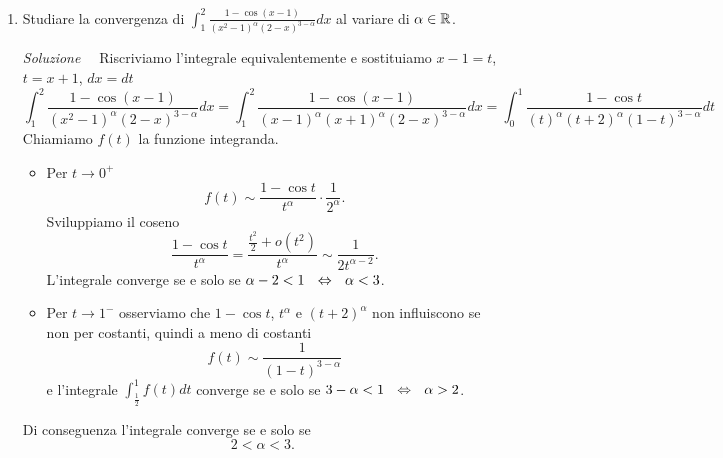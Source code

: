 \documentclass{article}
\begin{document}
\begin{enumerate}[label=\textbf{Esercizio 11.\arabic*.},itemindent=*]
\item Studiare la convergenza di $\int_1^2\frac{1-\cos (x-1)}{(x^2-1)^\alpha(2-x)^{3-\alpha}}dx$ al variare di $\alpha \in \mathbb{R}$.
\item[\textit{\large Soluzione~}]~Riscriviamo l'integrale equivalentemente e sostituiamo $x-1=t$, $t=x+1$, $dx=dt$
\[\int_1^2\frac{1-\cos (x-1)}{(x^2-1)^\alpha(2-x)^{3-\alpha}}dx=\int_1^2\frac{1-\cos (x-1)}{(x-1)^\alpha(x+1)^\alpha(2-x)^{3-\alpha}}dx=\int_0^1\frac{1-\cos t}{(t)^\alpha(t+2)^\alpha(1-t)^{3-\alpha}}dt\]
Chiamiamo $f(t)$ la funzione integranda.
\begin{itemize}
    \item Per $t\to0^+$
    \[f(t)\sim\frac{1-\cos t}{t^\alpha}\cdot\frac{1}{2^\alpha}.\]
    Sviluppiamo il coseno
    \[\frac{1-\cos t}{t^\alpha}=\frac{\frac{t^2}{2}+o(t^2)}{t^{\alpha}}\sim \frac{1}{2t^{\alpha - 2}}.\]
    L'integrale converge se e solo se $\alpha-2<1~~\Leftrightarrow~~\alpha<3$.
    \item Per $t\to1^-$ osserviamo che $1-\cos t$, $t^\alpha$ e $(t+2)^\alpha$ non influiscono se non per costanti, quindi a meno di costanti
    \[f(t)\sim \frac{1}{(1-t)^{3-\alpha}}\]
    e l'integrale $\int_{\frac{1}{2}}^1f(t)dt$ converge se e solo se $3-\alpha <1~~\Leftrightarrow~~\alpha>2$.
\end{itemize}
Di conseguenza l'integrale converge se e solo se 
\[2<\alpha<3.\]


\end{enumerate}
\end{document}
